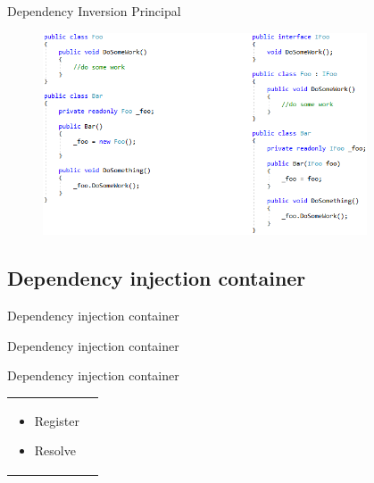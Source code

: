 \documentclass{beamer}
\begin{document}
\begin{frame}{Dependency Inversion Principal}
\begin{figure}
	\begin{center}
  		\includegraphics[height=6cm]{PresentationDIP.png}
	\end{center}
\end{figure}
\end{frame}

\subsection*{Dependency injection container}
\begin{frame}{Dependency injection container}
\begin{center}
\Large{Dependency injection container}
\end{center}
\end{frame}

\begin{frame}{Dependency injection container}
\begin{table}
     \begin{Large}
	\begin{tabular}{ p{6cm} p{6cm} }
		\begin{minipage}{.6\textwidth}
			\begin{itemize}
				\item Register
				\item Resolve
			\end{itemize}
   		 \end{minipage}
   		 &
	\end{tabular}
     \end{Large}
\end{table}
\end{frame}
\end{document}
